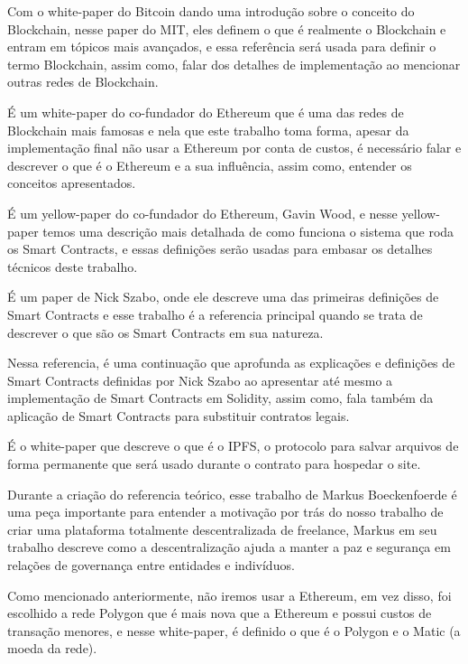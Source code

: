 \documentclass[
	12pt,				 %
	oneside,			 %
	a4paper,			 %
	chapter=TITLE,		 %
	section=TITLE,		 %
	sumario=tradicional, %
	english,			 %
	french,				 %
	spanish,			 %
	brazil				 %
	]{abntex2}
\begin{document}
\cite{blockchain}
Com o white-paper do Bitcoin dando uma introdução sobre o conceito do Blockchain, nesse paper do MIT, eles definem o que é realmente o Blockchain e entram em tópicos mais avançados, e essa referência será usada para definir o termo Blockchain, assim como, falar dos detalhes de implementação ao mencionar outras redes de Blockchain.

\cite{ethereum}
É um white-paper do co-fundador do Ethereum que é uma das redes de Blockchain mais famosas e nela que este trabalho toma forma, apesar da implementação final não usar a Ethereum por conta de custos, é necessário falar e descrever o que é o Ethereum e a sua influência, assim como, entender os conceitos apresentados.

\cite{ethereum_yellow}
É um yellow-paper do co-fundador do Ethereum, Gavin Wood, e nesse yellow-paper temos uma descrição mais detalhada de como funciona o sistema que roda os Smart Contracts, e essas definições serão usadas para embasar os detalhes técnicos deste trabalho.

\cite{smart_contract}
É um paper de Nick Szabo, onde ele descreve uma das primeiras definições de Smart Contracts e esse trabalho é a referencia principal quando se trata de descrever o que são os Smart Contracts em sua natureza.

\cite{smart_contract_blockchain}
Nessa referencia, é uma continuação que aprofunda as explicações e definições de Smart Contracts definidas por Nick Szabo ao apresentar até mesmo a implementação de Smart Contracts em Solidity, assim como, fala também da aplicação de Smart Contracts para substituir contratos legais.

\cite{ipfs}
É o white-paper que descreve o que é o IPFS, o protocolo para salvar arquivos de forma permanente que será usado durante o contrato para hospedar o site.

\cite{decentralization}
Durante a criação do referencia teórico, esse trabalho de Markus Boeckenfoerde é uma peça importante para entender a motivação por trás do nosso trabalho de criar uma plataforma totalmente descentralizada de freelance, Markus em seu trabalho descreve como a descentralização ajuda a manter a paz e segurança em relações de governança entre entidades e indivíduos.

\cite{polygon}
Como mencionado anteriormente, não iremos usar a Ethereum, em vez disso, foi escolhido a rede Polygon que é mais nova que a Ethereum e possui custos de transação menores, e nesse white-paper, é definido o que é o Polygon e o Matic (a moeda da rede).
\end{document}
